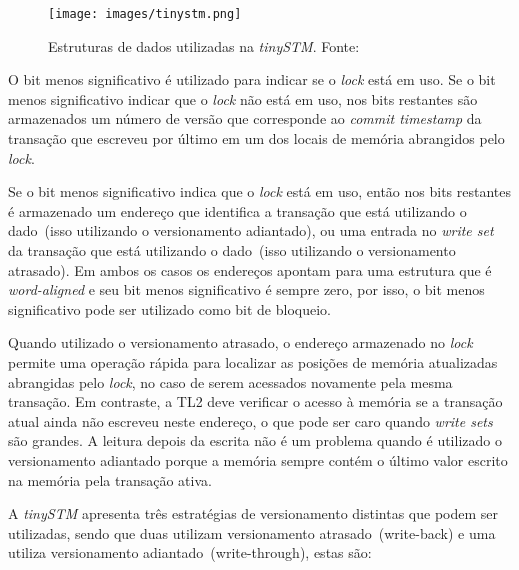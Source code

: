 \documentclass[diss,capa]{texufpel}
\begin{document}
\begin{figure}[!htp]
\centering
\texttt{[image: images/tinystm.png]}
\caption{Estruturas de dados utilizadas na \emph{tinySTM}. Fonte:~\cite{TINY}}
\label{figurasincronisacaotinystm}
\end{figure}

O bit menos significativo é utilizado para indicar se o \emph{lock} está em uso. Se o bit menos significativo indicar que o \emph{lock} não está em uso, nos bits restantes são armazenados um número de versão que corresponde ao \emph{commit timestamp} da transação que escreveu por último em um dos locais de memória abrangidos pelo \emph{lock}.

Se o bit menos significativo indica que o \emph{lock} está em uso, então nos bits restantes é armazenado um endereço que identifica a transação que está utilizando o dado~(isso utilizando o versionamento adiantado), ou uma entrada no \emph{write set} da transação que está utilizando o dado~(isso utilizando o versionamento atrasado). Em ambos os casos os endereços apontam para uma estrutura que é \emph{word-aligned} e seu bit menos significativo é sempre zero, por isso, o bit menos significativo pode ser utilizado como bit de bloqueio.

Quando utilizado o versionamento atrasado, o endereço armazenado no \emph{lock} permite uma operação rápida para localizar as posições de memória atualizadas abrangidas pelo \emph{lock}, no caso de serem acessados novamente pela mesma transação. Em contraste, a TL2 deve verificar o acesso à memória se a transação atual ainda não escreveu neste endereço, o que pode ser caro quando \emph{write sets} são grandes. A leitura depois da escrita não é um problema quando é utilizado o versionamento adiantado porque a memória sempre contém o último valor escrito na memória pela transação ativa.

A \emph{tinySTM} apresenta três estratégias de versionamento distintas que podem ser utilizadas, sendo que duas utilizam versionamento atrasado~(write-back) e uma utiliza versionamento adiantado~(write-through), estas são:
\end{document}
